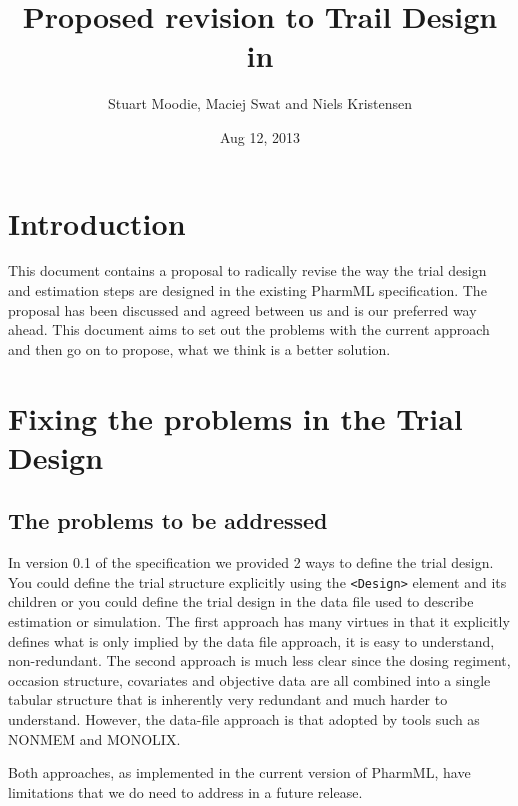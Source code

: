 \documentclass[a4paper,11pt]{article}
\author{Stuart Moodie, Maciej Swat and Niels Kristensen}
\date{Aug 12, 2013}
\title{Proposed revision to Trail Design in \pharmml}
\newcommand{\pharmml}{PharmML\xspace}
\newcommand{\xelem}[1]{\texttt{<#1>}\index{XML Element!\texttt{<#1>}}}
\begin{document}
\maketitle

\tableofcontents

\section{Introduction}

This document contains a proposal to radically revise the way the
trial design and estimation steps are designed in the existing
\pharmml specification. The proposal has been discussed and agreed
between us and is our preferred way ahead. This document aims to set
out the problems with the current approach and then go on to propose,
what we think is a better solution.

\section{Fixing the problems in the Trial Design}

\subsection{The problems to be addressed}

In version 0.1 of the specification we provided 2 ways to define the
trial design. You could define the trial structure explicitly using
the \xelem{Design} element and its children or you could define the
trial design in the data file used to describe estimation or
simulation. The first approach has many virtues in that it explicitly
defines what is only implied by the data file approach, it is easy
to understand, non-redundant. The second approach is much less clear
since the dosing regiment, occasion structure, covariates and
objective data are all combined into a single tabular structure that
is inherently very redundant and much harder to understand. However,
the data-file approach is that adopted by tools such as NONMEM and
MONOLIX.

Both approaches, as implemented in the current version of \pharmml,
have limitations that we do need to address in a future release.
\end{document}
